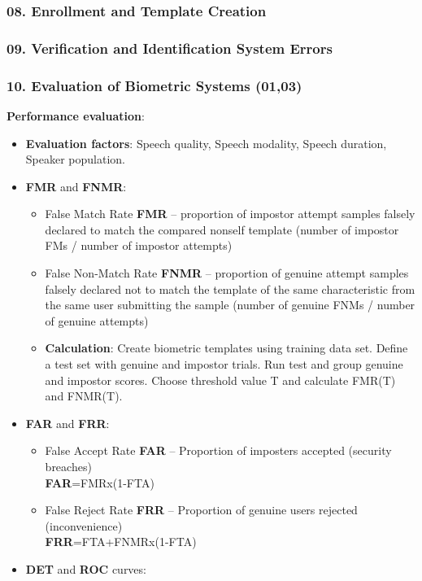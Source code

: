 \documentclass[a4paper]{article}
\begin{document}
    \subsubsection*{08. Enrollment and Template Creation}
    \subsubsection*{09. Verification and Identification System Errors}
    \subsubsection*{10. Evaluation of Biometric Systems (01,03)}
      \textbf{Performance evaluation}:
      \begin{itemize}
        \item \textbf{Evaluation factors}: Speech quality, Speech modality, Speech duration, Speaker population.
        \item \textbf{FMR} and \textbf{FNMR}:
        \begin{itemize}
          \item False Match Rate \textbf{FMR} -- proportion of impostor attempt samples falsely declared to match the compared nonself template (number of impostor FMs / number of impostor attempts)
          \item False Non-Match Rate \textbf{FNMR} -- proportion of genuine attempt samples falsely declared not to match the template of the same characteristic from the same user submitting the sample (number of genuine FNMs / number of genuine attempts)
          \item \textbf{Calculation}: Create biometric templates using training data set. Define a test set with genuine and impostor trials. Run test and group genuine and impostor scores. Choose threshold value T and calculate FMR(T) and FNMR(T).
        \end{itemize}
        \item \textbf{FAR} and \textbf{FRR}:
        \begin{itemize}
          \item False Accept Rate \textbf{FAR} -- Proportion of imposters accepted (security breaches)\\\textbf{FAR}=FMRx(1-FTA)
          \item False Reject Rate \textbf{FRR} -- Proportion of genuine users rejected (inconvenience)\\\textbf{FRR}=FTA+FNMRx(1-FTA)
        \end{itemize}
        \item \textbf{DET} and \textbf{ROC} curves:

\end{itemize}
\end{document}
